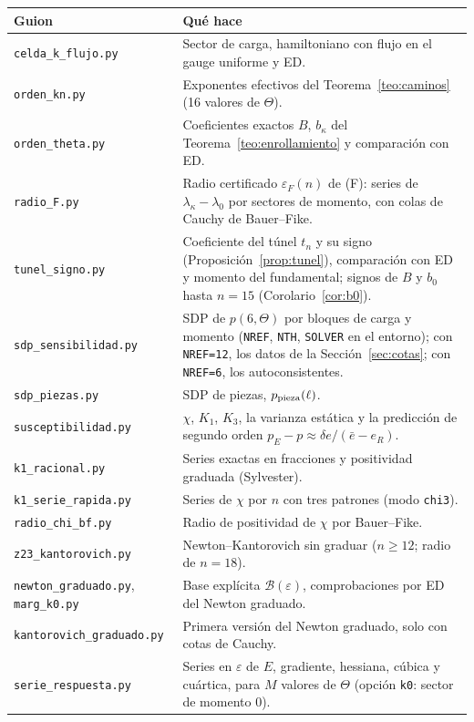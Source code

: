 \documentclass[11pt,a4paper]{article}
\theoremstyle{definition}
\theoremstyle{remark}
\newcommand{\eps}{\varepsilon}
\newcommand{\pE}{p_{E}}
\begin{document}
\begin{center}
\begin{tabular}{>{\raggedright}p{4.3cm}>{\raggedright\arraybackslash}p{10.2cm}}
\toprule
Guion & Qué hace\\
\midrule
\texttt{celda\_k\_flujo.py} & Sector de carga, hamiltoniano con flujo en el gauge uniforme y ED.\\
\texttt{orden\_kn.py} & Exponentes efectivos del Teorema~\ref{teo:caminos} (16 valores de $\Theta$).\\
\texttt{orden\_theta.py} & Coeficientes exactos $B$, $b_\kappa$ del Teorema~\ref{teo:enrollamiento} y comparación con ED.\\
\texttt{radio\_F.py} & Radio certificado $\eps_F(n)$ de (F): series de $\lambda_\kappa-\lambda_0$ por sectores de momento, con colas de Cauchy de Bauer--Fike.\\
\texttt{tunel\_signo.py} & Coeficiente del túnel $t_n$ y su signo (Proposición~\ref{prop:tunel}), comparación con ED y momento del fundamental; signos de $B$ y $b_0$ hasta $n=15$ (Corolario~\ref{cor:b0}).\\
\texttt{sdp\_sensibilidad.py} & SDP de $p(6,\Theta)$ por bloques de carga y momento (\texttt{NREF}, \texttt{NTH}, \texttt{SOLVER} en el entorno); con \texttt{NREF=12}, los datos de la Sección~\ref{sec:cotas}; con \texttt{NREF=6}, los autoconsistentes.\\
\texttt{sdp\_piezas.py} & SDP de piezas, $p_{\rm pieza}(\ell)$.\\
\texttt{susceptibilidad.py} & $\chi$, $K_1$, $K_3$, la varianza estática y la predicción de segundo orden $\pE-p\approx\delta e/(\bar e-e_R)$.\\
\texttt{k1\_racional.py} & Series exactas en fracciones y positividad graduada (Sylvester).\\
\texttt{k1\_serie\_rapida.py} & Series de $\chi$ por $n$ con tres patrones (modo \texttt{chi3}).\\
\texttt{radio\_chi\_bf.py} & Radio de positividad de $\chi$ por Bauer--Fike.\\
\texttt{z23\_kantorovich.py} & Newton--Kantorovich sin graduar ($n\ge12$; radio de $n=18$).\\
\texttt{newton\_graduado.py}, \texttt{marg\_k0.py} & Base explícita $\mathcal B(\eps)$, comprobaciones por ED del Newton graduado.\\
\texttt{kantorovich\_\allowbreak graduado.py} & Primera versión del Newton graduado, solo con cotas de Cauchy.\\
\texttt{serie\_respuesta.py} & Series en $\eps$ de $E$, gradiente, hessiana, cúbica y cuártica, para $M$ valores de $\Theta$ (opción \texttt{k0}: sector de momento $0$).\\

\end{tabular}
\end{center}
\end{document}
